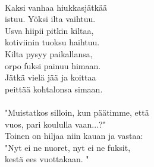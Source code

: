 \hspace{10mm} \\
            Kaksi vanhaa hiukkasjätkää \\
            istuu. Yöksi ilta vaihtuu. \\
            Usva hiipii pitkin kiltaa, \\
            kotiviinin tuoksu haihtuu. \\
            Kilta pysyy paikallansa, \\
            orpo fuksi painuu himaan. \\
            Jätkä vielä jää ja koittaa \\
            peittää kohtalonsa simaan. \\
\hspace{10mm} \\
            "Muistatkos silloin, kun päätimme, että \\
            vuos, pari koululla vaan...?" \\
            Toinen on hiljaa niin kauan ja vastaa: \\
            "Nyt ei ne nuoret, nyt ei ne fuksit, \\
            kestä ees vuottakaan. " \\
